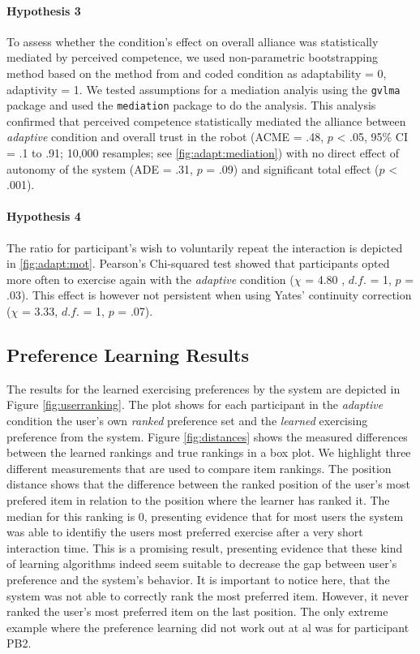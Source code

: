 \documentclass[twocolumn]{svjour3}          %
\begin{document}
\paragraph{Hypothesis 3}
To assess whether the condition's effect on overall alliance was
statistically mediated by perceived competence, we used non-parametric
bootstrapping method based on the method from
\autocite{preacher2008asymptotic} and coded condition as adaptability =
0, adaptivity = 1. We tested assumptions for a mediation analyis using
the \texttt{gvlma} package and used the \texttt{mediation} package to do
the analysis. This analysis confirmed that perceived competence
statistically mediated the alliance between \textit{adaptive} condition and
overall trust in the robot (ACME = .48, \(p\) \textless{} .05, 95\% CI =
.1 to .91; 10,000 resamples; see \autoref{fig:adapt:mediation}) with no
direct effect of autonomy of the system (ADE = .31, \(p\) = .09) and
significant total effect (\(p\) \textless{} .001).


\hypertarget{motivation-to-interaction}{%
\paragraph{Hypothesis 4}\label{motivation-to-interaction}}

The ratio for participant's wish to voluntarily repeat the interaction
is depicted in \autoref{fig:adapt:mot}. Pearson's Chi-squared test
showed that participants opted more often to exercise again with the
\textit{adaptive} condition (\(\chi\) = 4.80 , \(d.f.\) = 1, \(p\) = .03). This
effect is however not persistent when using Yates' continuity correction
(\(\chi\) = 3.33, \(d.f.\) = 1, \(p\) = .07).


\subsection{Preference Learning Results}

The results for the learned exercising preferences by the system are depicted in Figure \ref{fig:userranking}. The plot shows for each participant in the \textit{adaptive} condition the user's own \textit{ranked} preference set and the \textit{learned} exercising preference from the system. Figure \ref{fig:distances} shows the measured differences between the learned rankings and true rankings in a box plot. We highlight three different measurements that are used to compare item rankings.  The position distance shows that the difference between the ranked position of the user's most prefered item in relation to the position where the learner has ranked it. The median for this ranking is 0, presenting evidence that for most users the system was able to identifiy the users most preferred exercise after a very short interaction time. This is a promising result, presenting evidence that these kind of learning algorithms indeed seem suitable to decrease the gap between user's preference and the system's behavior. It is important to notice here, that the system was not able to correctly rank the most preferred item. However, it never ranked the user's most preferred item on the last position. The only extreme example where the preference learning did not work out at al was for participant PB2.  
\end{document}
